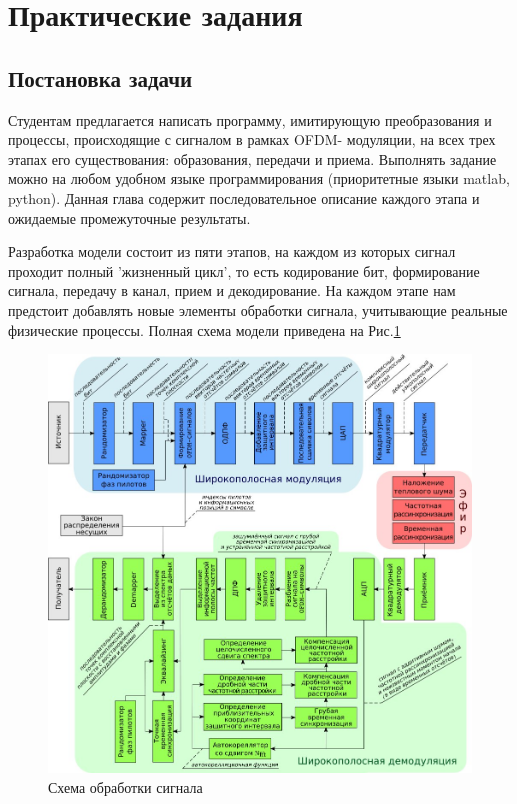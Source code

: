 \section{Практические задания}
\subsection*{Постановка задачи}
     Студентам предлагается написать программу, имитирующую преобразования и процессы, происходящие с сигналом в рамках OFDM- модуляции, на всех трех этапах его существования: образования, передачи и приема.
     Выполнять задание можно на любом удобном языке программирования (приоритетные языки matlab, python). 
     Данная глава содержит последовательное описание каждого этапа и ожидаемые промежуточные результаты.
    
Разработка модели состоит из пяти этапов, на каждом из которых сигнал проходит полный 'жизненный цикл', то есть кодирование бит, формирование сигнала, передачу в канал, прием и декодирование.  
На каждом этапе нам предстоит добавлять новые элементы обработки сигнала, учитывающие реальные физические процессы. Полная схема модели приведена на Рис.\ref{fg:schem0} 

\begin{figure}[H]
\centering
\includegraphics[width=1\textwidth]{schem11}
\caption{Схема обработки сигнала} \label{fg:schem0}
\end{figure}

